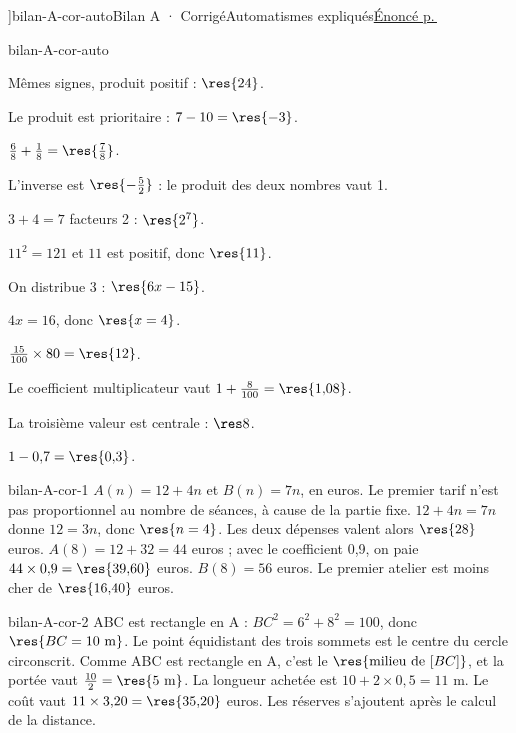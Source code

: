 \editionPage[\pdfbookmark[0]{Corrigés des bilans}{bm-bilan-A-cor-auto-parent}]{bilan-A-cor-auto}{Bilan A · Corrigé}{Automatismes expliqués}{\hyperref[bilan-A-auto]{Énoncé p.\,\pageref*{bilan-A-auto}}}
\begin{blocEdition}{bilan-A-cor-auto}
\begin{questions}
\item Mêmes signes, produit positif : $\res{24}$.
\item Le produit est prioritaire : $7-10=\res{-3}$.
\item $\frac68+\frac18=\res{\frac78}$.
\item L’inverse est $\res{-\frac52}$ : le produit des deux nombres vaut 1.
\item $3+4=7$ facteurs 2 : $\res{2^7}$.
\item $11^2=121$ et $11$ est positif, donc $\res{11}$.
\item On distribue 3 : $\res{6x-15}$.
\item $4x=16$, donc $\res{x=4}$.
\item $\frac{15}{100}\times80=\res{12}$.
\item Le coefficient multiplicateur vaut $1+\frac8{100}=\res{1{,}08}$.
\item La troisième valeur est centrale : $\res8$.
\item $1-0{,}7=\res{0{,}3}$.\end{questions}
\end{blocEdition}
\begin{blocEdition}{bilan-A-cor-1}
$A(n)=12+4n$ et $B(n)=7n$, en euros. Le premier tarif n’est pas proportionnel au nombre de séances, à cause de la partie fixe.
$12+4n=7n$ donne $12=3n$, donc $\res{n=4}$. Les deux dépenses valent alors $\res{28}$ euros.
$A(8)=12+32=44$ euros ; avec le coefficient 0,9, on paie $44\times0{,}9=\res{39{,}60}$ euros. $B(8)=56$ euros. Le premier atelier est moins cher de $\res{16{,}40}$ euros.
\end{blocEdition}
\begin{blocEdition}{bilan-A-cor-2}
ABC est rectangle en A : $BC^2=6^2+8^2=100$, donc $\res{BC=10\ \mathrm m}$.
Le point équidistant des trois sommets est le centre du cercle circonscrit. Comme ABC est rectangle en A, c’est le $\res{\text{milieu de }[BC]}$, et la portée vaut $\frac{10}2=\res{5\ \mathrm m}$.
La longueur achetée est $10+2\times0{,}5=11$ m. Le coût vaut $11\times3{,}20=\res{35{,}20}$ euros. Les réserves s’ajoutent après le calcul de la distance.\label{fig-bilan-A-cor-2}

\end{blocEdition}
